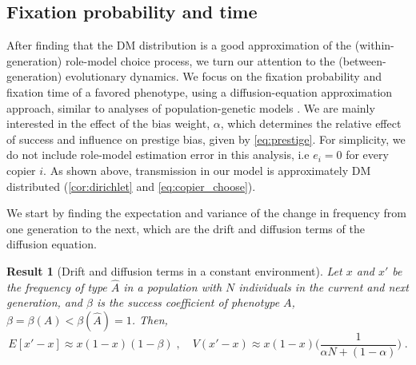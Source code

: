 \documentclass[12pt]{extarticle}
\newtheorem{result}{Result}
\begin{document}
\subsection{Fixation probability and time}

After finding that the DM distribution is a good approximation of the (within-generation) role-model choice process, we turn our attention to the (between-generation) evolutionary dynamics.
We focus on the fixation probability and fixation time of a favored phenotype, using a diffusion-equation approximation approach, similar to analyses of population-genetic models \citep{kimura,kimura_average,otto_fixation}.
We are mainly interested in the effect of the bias weight, $\alpha$, which determines the relative effect of success and influence on prestige bias, given by \cref{eq:prestige}.
For simplicity, we do not include role-model estimation error in this analysis, i.e $e_i=0$ for every copier $i$.
As shown above, transmission in our model is approximately DM distributed (\cref{cor:dirichlet} and \cref{eq:copier_choose}).

We start by finding the expectation and variance of the change in frequency from one generation to the next, which are the drift and diffusion terms of the diffusion equation.\\

\begin{result}[Drift and diffusion terms in a constant environment]
Let $x$ and $x'$ be the frequency of type $\hat{A}$ in a population with $N$ individuals in the current and next generation, and  $\beta$ is the success coefficient of phenotype $A$, $\beta = \beta(A) < \beta(\hat{A}) = 1$.
Then,
\begin{equation}
E[x'-x] \approx x(1-x)(1-\beta) \;, 
\quad
V(x'-x) \approx x(1-x)\Big(\frac{1}{\alpha N + (1-\alpha)}\Big) \;.
\end{equation} 
\end{result}
\end{document}
